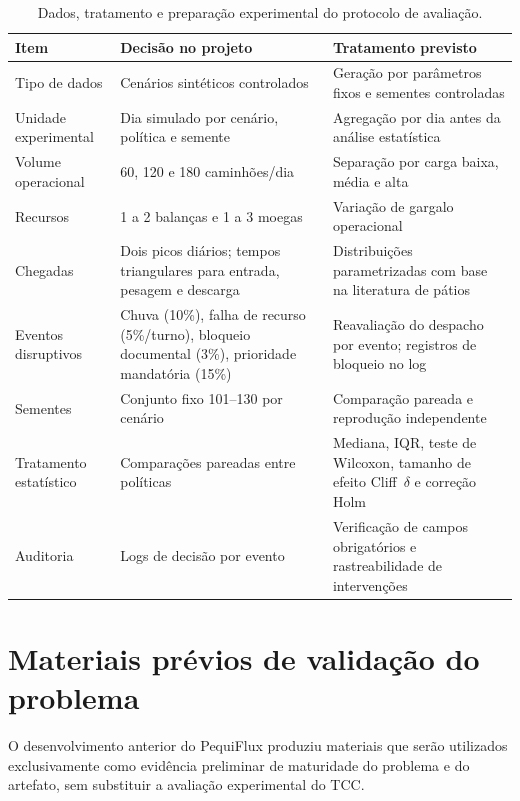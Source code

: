 \documentclass[
  12pt,
  oneside,
  a4paper,
  sumario=tradicional,
  brazil
]{abntex2}
\begin{document}
\begin{table}[H]
\centering
\small
\renewcommand{\arraystretch}{1.20}
\begin{tabularx}{\textwidth}{@{}P{0.24\textwidth}P{0.30\textwidth}Y@{}}
\toprule
\textbf{Item} & \textbf{Decis\~ao no projeto} & \textbf{Tratamento previsto} \\
\midrule
Tipo de dados & Cen\'arios sint\'eticos controlados & Gera\c{c}\~ao por par\^ametros fixos e sementes controladas \\
\addlinespace
Unidade experimental & Dia simulado por cen\'ario, pol\'itica e semente & Agrega\c{c}\~ao por dia antes da an\'alise estat\'istica \\
\addlinespace
Volume operacional & 60, 120 e 180 caminh\~oes/dia & Separa\c{c}\~ao por carga baixa, m\'edia e alta \\
\addlinespace
Recursos & 1 a 2 balan\c{c}as e 1 a 3 moegas & Varia\c{c}\~ao de gargalo operacional \\
\addlinespace
Chegadas & Dois picos di\'arios; tempos triangulares para entrada, pesagem e descarga & Distribui\c{c}\~oes parametrizadas com base na literatura de p\'atios \\
\addlinespace
Eventos disruptivos & Chuva (10\%), falha de recurso (5\%/turno), bloqueio documental (3\%), prioridade mandat\'oria (15\%) & Reavalia\c{c}\~ao do despacho por evento; registros de bloqueio no log \\
\addlinespace
Sementes & Conjunto fixo 101--130 por cen\'ario & Compara\c{c}\~ao pareada e reprodu\c{c}\~ao independente \\
\addlinespace
Tratamento estat\'istico & Compara\c{c}\~oes pareadas entre pol\'iticas & Mediana, IQR, teste de Wilcoxon, tamanho de efeito Cliff~$\delta$ e corre\c{c}\~ao Holm \\
\addlinespace
Auditoria & Logs de decis\~ao por evento & Verifica\c{c}\~ao de campos obrigat\'orios e rastreabilidade de interven\c{c}\~oes \\
\bottomrule
\end{tabularx}
\caption{Dados, tratamento e prepara\c{c}\~ao experimental do protocolo de avalia\c{c}\~ao.}
\end{table}

\section{Materiais pr\'evios de valida\c{c}\~ao do problema}

O desenvolvimento anterior do PequiFlux produziu materiais que ser\~ao utilizados exclusivamente como evid\^encia preliminar de maturidade do problema e do artefato, sem substituir a avalia\c{c}\~ao experimental do TCC.
\end{document}
